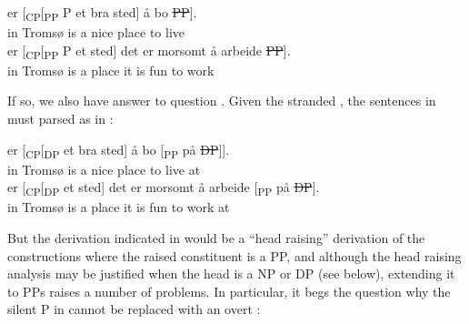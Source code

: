 \documentclass[output=paper]{LSP/langsci}
\begin{document}
\ea%
    \label{ex:taraldsen:27}
    \ea {} er {[\textsubscript{CP}[\textsubscript{PP} P} et bra sted] å bo \st{PP}].\\
              {} in Tromsø is       {}   a nice place to live\\
    \ex {} er [\textsubscript{CP}[\textsubscript{PP} P et sted] det er morsomt å arbeide \st{PP}].\\
              {} in Tromsø is       {} {}   a place  it   is fun          to work \\
    \z
\z

If so, we also have answer to question . Given the stranded , the sentences in  must parsed as in :

\begin{exe}
  \z
\end{exe}

\ea\label{ex:taraldsen:29}
  \ea {} er [\textsubscript{CP}[\textsubscript{DP} et bra sted] å bo [\textsubscript{PP} på \st{DP}]].\\
             {}                in Tromsø  is     {}                                a nice place to live {} at\\
  \ex {} er [\textsubscript{CP}[\textsubscript{DP} et sted] det er morsomt å arbeide [\textsubscript{PP} på \st{DP}].\\
             {}               in Tromsø  is    {}                                  a place  it is  fun      to work             {}        at\\
  \z
\z

But the derivation indicated in  would be a “head raising” derivation of the  constructions where the raised constituent is a PP, and although the head raising analysis may be justified when the head is a NP or DP (see  below), extending it to PPs raises a number of problems. In particular, it begs the question why the silent P in  cannot be replaced with an overt :
\end{document}
